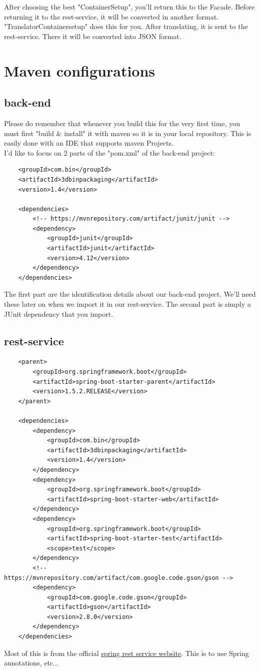 \documentclass[a4paper,12pt]{article}
\begin{document}
After choosing the best "ContainerSetup", you'll return this to the Facade. Before returning it to the rest-service, it will be converted in another format. "TranslatorContainersetup" does this for you. After translating, it is sent to the rest-service. There it will be converted into JSON format.

\section{Maven configurations}
\subsection{back-end}
Please do remember that whenever you build this for the very first time, you must first "build \& install" it with maven so it is in your local repository. This is easily done with an IDE that supports maven Projects. \\

I'd like to focus on 2 parts of the "pom.xml" of the back-end project: 
\lstset{language=xml}
\begin{lstlisting}
	<groupId>com.bin</groupId>
	<artifactId>3dbinpackaging</artifactId>
	<version>1.4</version>
	
	<dependencies>
		<!-- https://mvnrepository.com/artifact/junit/junit -->
		<dependency>
			<groupId>junit</groupId>
			<artifactId>junit</artifactId>
			<version>4.12</version>
		</dependency>
	</dependencies>
\end{lstlisting}

The first part are the identification details about our back-end project. We'll need these later on when we import it in our rest-service. The second part is simply a JUnit dependency that you import.

\pagebreak
\subsection{rest-service}
\begin{lstlisting}
	<parent>
		<groupId>org.springframework.boot</groupId>
		<artifactId>spring-boot-starter-parent</artifactId>
		<version>1.5.2.RELEASE</version>
	</parent>
	
	<dependencies>
		<dependency>
			<groupId>com.bin</groupId>
			<artifactId>3dbinpackaging</artifactId>
			<version>1.4</version>
		</dependency>
		<dependency>
			<groupId>org.springframework.boot</groupId>
			<artifactId>spring-boot-starter-web</artifactId>
		</dependency>
		<dependency>
			<groupId>org.springframework.boot</groupId>
			<artifactId>spring-boot-starter-test</artifactId>
			<scope>test</scope>
		</dependency>
		<!-- https://mvnrepository.com/artifact/com.google.code.gson/gson -->
		<dependency>
			<groupId>com.google.code.gson</groupId>
			<artifactId>gson</artifactId>
			<version>2.8.0</version>
		</dependency>
	</dependencies>
\end{lstlisting}
Most of this is from the official \hyperref{https://spring.io/guides/gs/rest-service/}{}{}{spring rest service website}. This is to use Spring annotations, etc... \\
\end{document}
